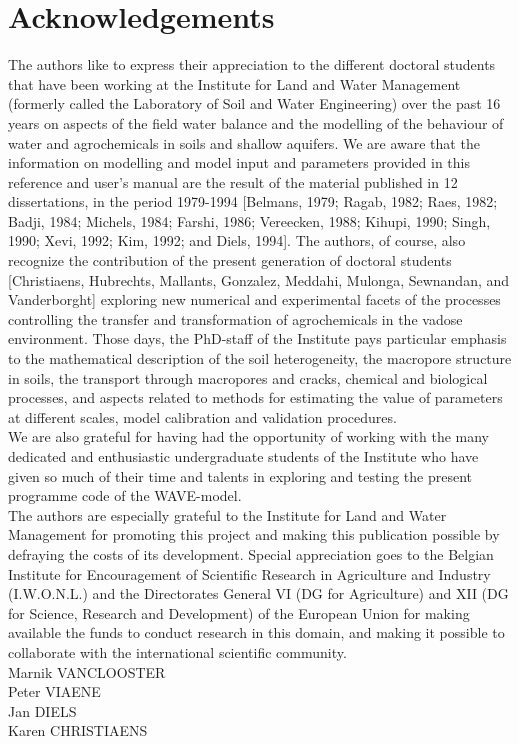 \chapter{Acknowledgements}
The authors like to express their appreciation to the different doctoral students that have been working at the Institute for Land and Water Management (formerly called the Laboratory of Soil and Water Engineering) over the past 16 years on aspects of the field water balance and the modelling of the behaviour of water and agrochemicals in soils and shallow aquifers. We are aware that the information on modelling and model input and parameters provided in this reference and user's manual are the result of the material published in 12 dissertations, in the period 1979-1994 [Belmans, 1979; Ragab, 1982; Raes, 1982; Badji, 1984; Michels, 1984; Farshi, 1986; Vereecken, 1988; Kihupi, 1990; Singh, 1990; Xevi, 1992; Kim, 1992; and Diels, 1994]. The authors, of course, also recognize the contribution of the present generation of doctoral students [Christiaens, Hubrechts, Mallants, Gonzalez, Meddahi, Mulonga, Sewnandan, and Vanderborght] exploring new numerical and experimental facets of the processes controlling the transfer and transformation of agrochemicals in the vadose environment. Those days, the PhD-staff of the Institute pays particular emphasis to the mathematical description of the soil heterogeneity, the macropore structure in soils, the transport through macropores and cracks, chemical and biological processes, and aspects related to methods for estimating the value of parameters at different scales, model calibration and validation procedures.\\

We are also grateful for having had the opportunity of working with the many dedicated and enthusiastic undergraduate students of the Institute who have given so much of their time and talents in exploring and testing the present programme code of the WAVE-model.\\

The authors are especially grateful to the Institute for Land and Water Management for promoting this project and making this publication possible by defraying the costs of its development. Special appreciation goes to the Belgian Institute for Encouragement of Scientific Research in Agriculture and Industry (I.W.O.N.L.) and the Directorates General VI (DG for Agriculture) and XII (DG for Science, Research and Development) of the European Union for making available the funds to conduct research in this domain, and making it possible to collaborate with the international scientific community.\\


Marnik VANCLOOSTER\\
Peter VIAENE\\
Jan DIELS\\
Karen CHRISTIAENS
